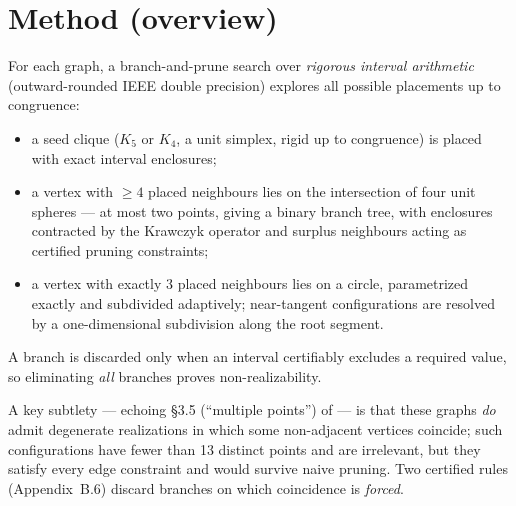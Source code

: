 \documentclass[11pt]{article}
\begin{document}
\section*{Method (overview)}

For each graph, a branch-and-prune search over \emph{rigorous interval
arithmetic} (outward-rounded IEEE double precision) explores all possible
placements up to congruence:

\begin{itemize}
\item a seed clique ($K_5$ or $K_4$, a unit simplex, rigid up to congruence)
      is placed with exact interval enclosures;
\item a vertex with $\ge 4$ placed neighbours lies on the intersection of four
      unit spheres --- at most two points, giving a binary branch tree, with
      enclosures contracted by the Krawczyk operator and surplus neighbours
      acting as certified pruning constraints;
\item a vertex with exactly $3$ placed neighbours lies on a circle,
      parametrized exactly and subdivided adaptively; near-tangent
      configurations are resolved by a one-dimensional subdivision along the
      root segment.
\end{itemize}

A branch is discarded only when an interval certifiably excludes a required
value, so eliminating \emph{all} branches proves non-realizability.

A key subtlety --- echoing \S3.5 (``multiple points'') of \cite{Gyorey} --- is
that these graphs \emph{do} admit degenerate realizations in which some
non-adjacent vertices coincide; such configurations have fewer than 13 distinct
points and are irrelevant, but they satisfy every edge constraint and would
survive naive pruning. Two certified rules (Appendix~B.6) discard branches on
which coincidence is \emph{forced}.
\end{document}
